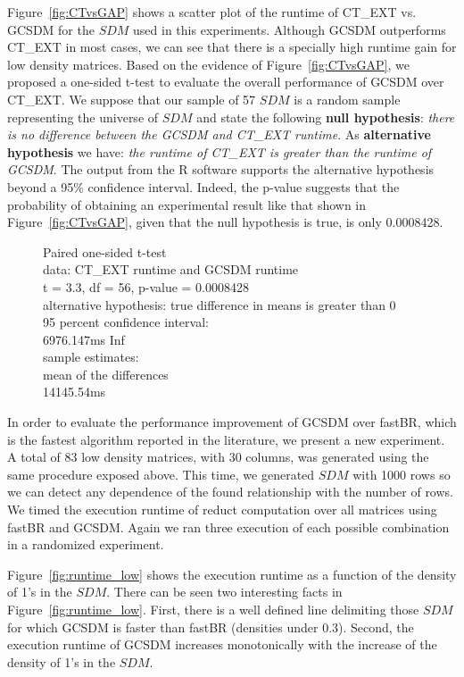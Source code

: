 \documentclass[authoryear,11pt]{elsarticle}
\begin{document}
	Figure~\ref{fig:CTvsGAP} shows a scatter plot of the runtime of CT\_EXT vs. GCSDM for the $SDM$ used in
	this experiments. Although GCSDM outperforms CT\_EXT in most cases, we can see that there is a specially
	high runtime gain for low density matrices. Based on the evidence of Figure~\ref{fig:CTvsGAP}, we 
	proposed a one-sided t-test to evaluate the overall performance of GCSDM over CT\_EXT. We suppose that
	our sample of 57 $SDM$ is a random sample representing the universe of $SDM$ and state the following
	\textbf{null hypothesis}: \emph{there is no difference between the GCSDM and CT\_EXT runtime}. As 
	\textbf{alternative hypothesis} we have: \emph{the runtime of CT\_EXT is greater than the runtime of GCSDM}.
	The output from the R software supports the alternative hypothesis beyond
	a 95\% confidence interval. Indeed, the p-value suggests that the probability of obtaining an experimental
	result like that shown in Figure~\ref{fig:CTvsGAP}, given that the null hypothesis is true, is only 
	0.0008428.
	
	\begin{figure}
		\qquad{}	Paired one-sided t-test\\

		data:  CT\_EXT runtime and GCSDM runtime\\
		t = 3.3, df = 56, p-value = 0.0008428\\
		alternative hypothesis: true difference in means is greater than 0\\
		95 percent confidence interval:\\
		 6976.147ms  \qquad{}  Inf\\
		sample estimates:\\
		mean of the differences \\
		 \qquad{}    14145.54ms
	\end{figure}
	
	In order to evaluate the performance improvement of GCSDM over fastBR, which is the fastest algorithm 
	reported in the literature, we present a new experiment. A total 	of 83 low density matrices, with 30 
	columns, was generated using the same procedure exposed above. This time, we generated $SDM$ with 1000 
	rows so we can detect any dependence of the found relationship with the number of rows. We timed the 
	execution runtime of reduct computation over all matrices using fastBR and GCSDM. 
	Again we ran three execution of each possible combination in a randomized experiment.
	
	Figure~\ref{fig:runtime_low} shows the execution runtime as a function of the density of 1's in the $SDM$.
	There can be seen two interesting facts in Figure~\ref{fig:runtime_low}. First, there is a well defined
	line delimiting those $SDM$ for which GCSDM is faster than fastBR (densities under 0.3). Second, the
	execution runtime of GCSDM increases monotonically with the increase of the density of 1's in the $SDM$.
	
\end{document}
